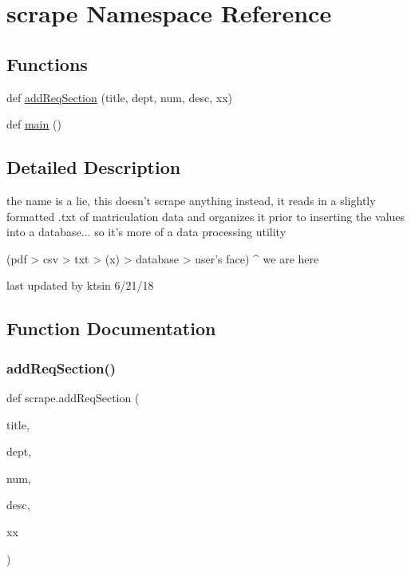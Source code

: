 \hypertarget{namespacescrape}{}\section{scrape Namespace Reference}
\label{namespacescrape}
\subsection*{Functions}
\begin{DoxyCompactItemize}
\item 
def \mbox{\hyperlink{namespacescrape_ac72ffc4d789a94d65b548726045faa93}{add\+Req\+Section}} (title, dept, num, desc, xx)
\item 
def \mbox{\hyperlink{namespacescrape_a5653dd5601f9b92af6a260a7fab1ff43}{main}} ()
\end{DoxyCompactItemize}


\subsection{Detailed Description}
\begin{DoxyVerb}the name is a lie, this doesn't scrape anything
instead, it reads in a slightly formatted .txt
of matriculation data and organizes it prior to
inserting the values into a database...
so it's more of a data processing utility

(pdf > csv > txt > (x) > database > user's face)
                    ^
                we are here


last updated by ktsin 6/21/18\end{DoxyVerb}
 

\subsection{Function Documentation}
\mbox{\label{namespacescrape_ac72ffc4d789a94d65b548726045faa93}} 
\subsubsection{\texorpdfstring{add\+Req\+Section()}{addReqSection()}}
{\footnotesize\ttfamily def scrape.\+add\+Req\+Section (\begin{DoxyParamCaption}\item[{}]{title,  }\item[{}]{dept,  }\item[{}]{num,  }\item[{}]{desc,  }\item[{}]{xx }\end{DoxyParamCaption})}



